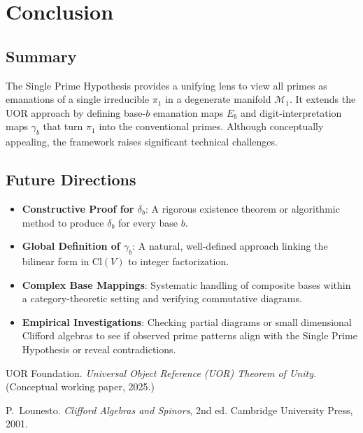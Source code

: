 \documentclass[11pt]{article}
\begin{document}
\section{Conclusion}

\subsection{Summary}
The Single Prime Hypothesis provides a unifying lens to view all primes 
as emanations of a single irreducible $\pi_1$ in a degenerate manifold $\mathcal{M}_1$.  
It extends the UOR approach by defining base-$b$ emanation maps $E_b$ and 
digit-interpretation maps $\gamma_b$ that turn $\pi_1$ into the conventional primes. 
Although conceptually appealing, the framework raises significant technical challenges.

\subsection{Future Directions}
\begin{itemize}
\item \textbf{Constructive Proof for $\delta_b$}: A rigorous existence theorem 
  or algorithmic method to produce $\delta_b$ for every base $b$.
\item \textbf{Global Definition of $\gamma_b$}: A natural, well-defined approach 
  linking the bilinear form in $\mathrm{Cl}(V)$ to integer factorization.
\item \textbf{Complex Base Mappings}: Systematic handling of composite bases 
  within a category-theoretic setting and verifying commutative diagrams.
\item \textbf{Empirical Investigations}: Checking partial diagrams or small 
  dimensional Clifford algebras to see if observed prime patterns 
  align with the Single Prime Hypothesis or reveal contradictions.
\end{itemize}

\begin{thebibliography}{99}

UOR Foundation. 
\emph{Universal Object Reference (UOR) Theorem of Unity.} 
(Conceptual working paper, 2025.)

P.~Lounesto.
\emph{Clifford Algebras and Spinors}, 2nd ed. 
Cambridge University Press, 2001.

\end{thebibliography}
\end{document}
